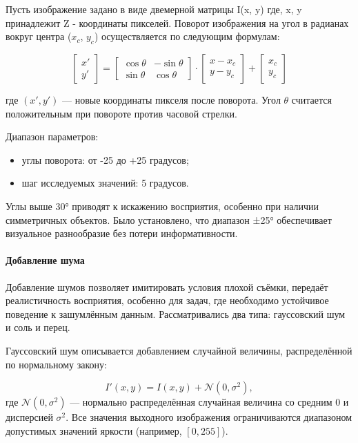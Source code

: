 Пусть изображение задано в виде двемерной матрицы I(x, y) где, x, y принадлежит Z - координаты пикселей. Поворот изображения на угол в радианах вокруг центра ($x_c$, $y_c$) осуществляется по следующим формулам:


\[
\begin{bmatrix}
	x' \\
	y'
\end{bmatrix}
=
\begin{bmatrix}
	\cos\theta & -\sin\theta \\
	\sin\theta & \cos\theta
\end{bmatrix}
\cdot
\begin{bmatrix}
	x - x_c \\
	y - y_c
\end{bmatrix}
+
\begin{bmatrix}
	x_c \\
	y_c
\end{bmatrix}
\]

где $(x', y')$ — новые координаты пикселя после поворота. Угол $\theta$ считается положительным при повороте против часовой стрелки.

Диапазон параметров:
\begin{itemize}
	\item углы поворота: от -25 до +25 градусов;
	\item шаг исследуемых значений: 5 градусов.
\end{itemize}

Углы выше 30° приводят к искажению восприятия, особенно при наличии симметричных объектов. Было установлено, что диапазон ±25° обеспечивает визуальное разнообразие без потери информативности.


\paragraph{Добавление шума}
	
Добавление шумов позволяет имитировать условия плохой съёмки, передаёт реалистичность восприятия, особенно для задач, где необходимо устойчивое поведение к зашумлённым данным. Рассматривались два типа: гауссовский шум и соль и перец.

Гауссовский шум описывается добавлением случайной величины, распределённой по нормальному закону:

\[
I'(x, y) = I(x, y) + \mathcal{N}(0, \sigma^2),
\]
где $\mathcal{N}(0, \sigma^2)$ — нормально распределённая случайная величина со средним $0$ и дисперсией $\sigma^2$. Все значения выходного изображения ограничиваются диапазоном допустимых значений яркости (например, $[0, 255]$).
	
